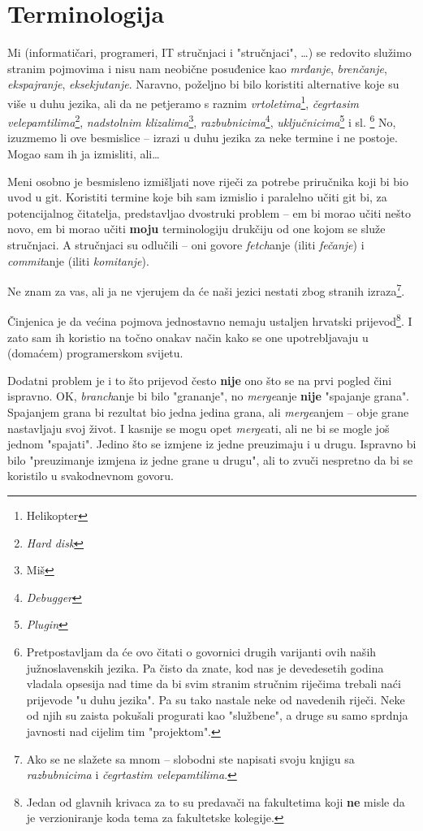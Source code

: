 \chapter*{Terminologija}

Mi (informatičari, programeri, IT stručnjaci i "stručnjaci", \dots) se redovito služimo stranim pojmovima i nisu nam neobične posuđenice kao \emph{mrđanje}, \emph{brenčanje}, \emph{ekspajranje}, \emph{eksekjutanje}.
Naravno, poželjno bi bilo koristiti alternative koje su više u duhu jezika, ali da ne petjeramo s raznim \emph{vrtoletima}\footnote{Helikopter}, \emph{čegrtasim velepamtilima}\footnote{\emph{Hard disk}}, \emph{nadstolnim klizalima}\footnote{Miš}, \emph{razbubnicima}\footnote{\emph{Debugger}}, \emph{uključnicima}\footnote{\emph{Plugin}} i sl.%
\footnote{Pretpostavljam da će ovo čitati o govornici drugih varijanti ovih naših južnoslavenskih jezika. Pa čisto da znate, kod nas je devedesetih godina vladala opsesija nad time da bi svim stranim stručnim riječima trebali naći prijevode "u duhu jezika". Pa su tako nastale neke od navedenih riječi. Neke od njih su zaista pokušali progurati kao "službene", a druge su samo sprdnja javnosti nad cijelim tim "projektom".}
No, izuzmemo li ove besmislice -- izrazi u duhu jezika za neke termine i ne postoje.
Mogao sam ih ja izmisliti, ali\dots

Meni osobno je besmisleno izmišljati nove riječi za potrebe priručnika koji bi bio uvod u git.
Koristiti termine koje bih sam izmislio i paralelno učiti git bi, za potencijalnog čitatelja, predstavljao dvostruki problem -- em bi morao učiti nešto novo, em bi morao učiti \textbf{moju} terminologiju drukčiju od one kojom se služe stručnjaci.
A stručnjaci su odlučili -- oni govore \emph{fetch}anje (iliti \emph{fečanje}) i \emph{commit}anje (iliti \emph{komitanje}).

Ne znam za vas, ali ja ne vjerujem da će naši jezici nestati zbog stranih izraza\footnote{Ako se ne slažete sa mnom -- slobodni ste napisati svoju knjigu sa \emph{razbubnicima} i \emph{čegrtastim velepamtilima}.}.

Činjenica je da većina pojmova jednostavno nemaju ustaljen hrvatski prijevod\footnote{Jedan od glavnih krivaca za to su predavači na fakultetima koji \textbf{ne} misle da je verzioniranje koda tema za fakultetske kolegije.}. 
I zato sam ih koristio na točno onakav način kako se one upotrebljavaju u (domaćem) programerskom svijetu.

Dodatni problem je i to što prijevod često \textbf{nije} ono što se na prvi pogled čini ispravno.
OK, \emph{branch}anje bi bilo "grananje", no \emph{merge}anje \textbf{nije} "spajanje grana". 
Spajanjem grana bi rezultat bio jedna jedina grana, ali \emph{merge}anjem -- obje grane nastavljaju svoj život. 
I kasnije se mogu opet \emph{merge}ati, ali ne bi se mogle još jednom "spajati".
Jedino što se izmjene iz jedne preuzimaju i u drugu. 
Ispravno bi bilo "preuzimanje izmjena iz jedne grane u drugu", ali to zvuči nespretno da bi se koristilo u svakodnevnom govoru.

